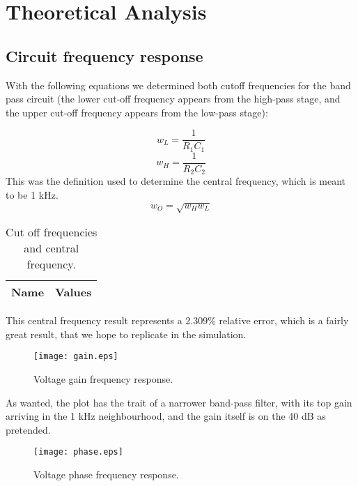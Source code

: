 \section{Theoretical Analysis}
\label{sec:analysis}
\subsection{Circuit frequency response}
With the following equations we determined both cutoff frequencies for the band pass circuit (the lower cut-off frequency appears from the high-pass stage, and the upper cut-off frequency appears from the low-pass stage):

\begin{equation}
w_L=\frac{1}{R_{1}C_{1}}
\end{equation}
\begin{equation}
w_H=\frac{1}{R_{2}C_{2}}
\end{equation}
This was the definition used to determine the central frequency, which is meant to be 1 kHz.
\begin{equation}
w_O=\sqrt{w_{H}w_{L}}
\end{equation}

\begin{table}[h!]
  \centering
  \begin{tabular}{|l|r|}
    \hline    
    {\bf Name} & {\bf Values} \\ \hline
     
  \end{tabular}
  \caption{Cut off frequencies and central frequency.}
  \label{tab:data}
\end{table}

This central frequency result represents a 2.309\% relative error, which is a fairly great result, that we hope to replicate in the simulation.

\begin{figure}[h!] \centering
\texttt{[image: gain.eps]}
\caption{Voltage gain frequency response.}
\label{fig:gainfreq}
\end{figure}

As wanted, the plot has the trait of a narrower band-pass filter, with its top gain arriving in the 1 kHz neighbourhood, and the gain itself is on the 40 dB as pretended.

\begin{figure}[h!] \centering
\texttt{[image: phase.eps]}
\caption{Voltage phase frequency response.}
\label{fig:gainfreq}
\end{figure}

